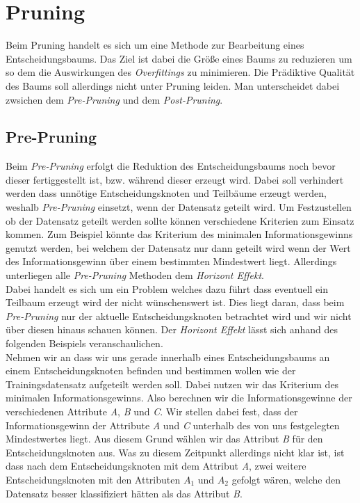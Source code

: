 \chapter{Pruning}
\label{pruning}
Beim Pruning handelt es sich um eine Methode zur Bearbeitung eines Entscheidungsbaums. Das Ziel ist dabei die Größe eines Baums zu reduzieren um so dem die Auswirkungen des \textit{Overfittings} zu minimieren. Die Prädiktive Qualität des Baums soll allerdings nicht unter Pruning leiden. \autocites{WikiPruning:online}{DataMining} Man unterscheidet dabei zwsichen dem \textit{Pre-Pruning} und dem \textit{Post-Pruning}. \autocite{DataMining}

\section{Pre-Pruning}
\label{pre-pruning}
Beim \textit{Pre-Pruning} erfolgt die Reduktion des Entscheidungsbaums noch bevor dieser fertiggestellt ist, bzw. während dieser erzeugt wird. Dabei soll verhindert werden dass unnötige Entscheidungsknoten und Teilbäume erzeugt werden, weshalb \textit{Pre-Pruning} einsetzt, wenn der Datensatz geteilt wird. Um Festzustellen ob der Datensatz geteilt werden sollte können verschiedene Kriterien zum Einsatz kommen. Zum Beispiel könnte das Kriterium des minimalen Informationsgewinns genutzt werden, bei welchem der Datensatz nur dann geteilt wird wenn der Wert des Informationsgewinn über einem bestimmten Mindestwert liegt. \autocite{DataMining} Allerdings unterliegen alle \textit{Pre-Pruning} Methoden dem \textit{Horizont Effekt}. \autocite{WikiPruning:online}\\
Dabei handelt es sich um ein Problem welches dazu führt dass eventuell ein Teilbaum erzeugt wird der nicht wünschenswert ist. Dies liegt daran, dass beim \textit{Pre-Pruning} nur der aktuelle Entscheidungsknoten betrachtet wird und wir nicht über diesen hinaus schauen können. \autocites{HorizonProblem:online}{WikiPruning:online} Der \textit{Horizont Effekt} lässt sich anhand des folgenden Beispiels veranschaulichen.\\
Nehmen wir an dass wir uns gerade innerhalb eines Entscheidungsbaums an einem Entscheidungsknoten befinden und bestimmen wollen wie der Trainingsdatensatz aufgeteilt werden soll. Dabei nutzen wir das Kriterium des minimalen Informationsgewinns. Also berechnen wir die Informationsgewinne der verschiedenen Attribute \textit{A}, \textit{B} und \textit{C}. Wir stellen dabei fest, dass der Informationsgewinn der Attribute \textit{A} und \textit{C} unterhalb des von uns festgelegten Mindestwertes liegt. Aus diesem Grund wählen wir das Attribut \textit{B} für den Entscheidungsknoten aus. Was zu diesem Zeitpunkt allerdings nicht klar ist, ist dass nach dem Entscheidungsknoten mit dem Attribut \textit{A}, zwei weitere Entscheidungsknoten mit den Attributen $A_{1}$ und $A_{2}$ gefolgt wären, welche den Datensatz besser klassifiziert hätten als das Attribut \textit{B}.\\

